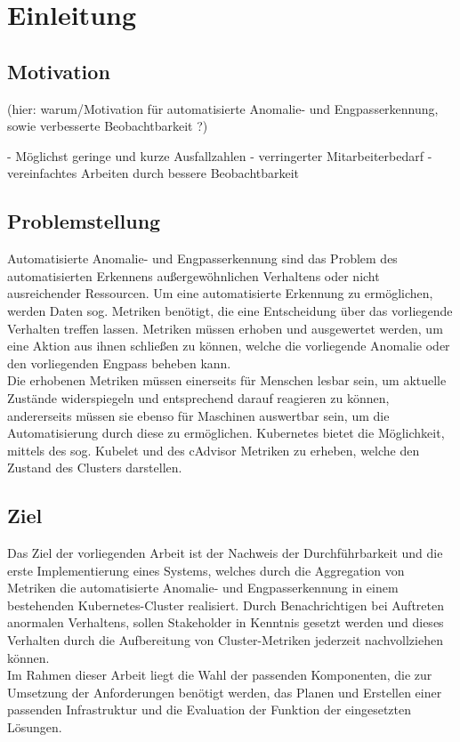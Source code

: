 \documentclass[a4paper,12pt]{scrartcl}
\title{}
\author{Johannes Bohlig}
\date{\today}
\begin{document}
\tableofcontents

\pagebreak

\section{Einleitung}
\subsection{Motivation}

(hier: warum/Motivation für automatisierte Anomalie- und Engpasserkennung, sowie verbesserte Beobachtbarkeit ?)

- Möglichst geringe und kurze Ausfallzahlen
- verringerter Mitarbeiterbedarf
- vereinfachtes Arbeiten durch bessere Beobachtbarkeit


\subsection{Problemstellung}

Automatisierte Anomalie- und Engpasserkennung sind das Problem des automatisierten Erkennens außergewöhnlichen Verhaltens oder nicht ausreichender Ressourcen. Um eine automatisierte Erkennung zu ermöglichen, werden Daten sog. Metriken benötigt, die eine Entscheidung über das vorliegende Verhalten treffen lassen. Metriken müssen erhoben und ausgewertet werden, um eine Aktion aus ihnen schließen zu können, welche die vorliegende Anomalie oder den vorliegenden Engpass beheben kann.\\
Die erhobenen Metriken müssen einerseits für Menschen lesbar sein, um aktuelle Zustände widerspiegeln und entsprechend darauf reagieren zu können, andererseits müssen sie ebenso für Maschinen auswertbar sein, um die Automatisierung durch diese zu ermöglichen.
Kubernetes bietet die Möglichkeit, mittels des sog. Kubelet und des cAdvisor Metriken zu erheben, welche den Zustand des Clusters darstellen. 

\subsection{Ziel}

Das Ziel der vorliegenden Arbeit ist der Nachweis der Durchführbarkeit und die erste Implementierung eines Systems, welches durch die Aggregation von Metriken die automatisierte Anomalie- und Engpasserkennung in einem bestehenden Kubernetes-Cluster realisiert. Durch Benachrichtigen bei Auftreten anormalen Verhaltens, sollen Stakeholder in Kenntnis gesetzt werden und dieses Verhalten durch die Aufbereitung von Cluster-Metriken jederzeit nachvollziehen können.\\
Im Rahmen dieser Arbeit liegt die Wahl der passenden Komponenten, die zur Umsetzung der Anforderungen benötigt werden, das Planen und Erstellen einer passenden Infrastruktur und die Evaluation der Funktion der eingesetzten Lösungen.
\end{document}
